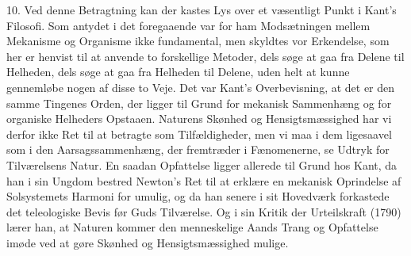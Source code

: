 \documentclass[12pt]{article}
\newcommand{\opage}[1]{\marginnote{\footnotesize\textit{[#1]}}}
\begin{document}
10. Ved denne Betragtning kan der kastes Lys over et væsentligt Punkt i
Kant's Filosofi. Som antydet i det foregaaende var for ham Modsætningen
mellem Mekanisme og Organisme ikke fundamental, men skyldtes vor
Erkendelse, som her er henvist til at anvende to forskellige Metoder,
dels søge at gaa fra Delene til Helheden, dels søge at gaa fra
Helheden til Delene, uden helt at kunne gennemløbe nogen af disse to
Veje. Det var Kant's Overbevisning, at det er den samme Tingenes Orden,
der ligger til Grund for mekanisk Sammenhæng og for organiske Helheders
Opstaaen. Naturens Skønhed og Hensigtsmæssighed har vi derfor ikke Ret
til at betragte som Tilfældigheder, men vi maa i dem ligesaavel som i
den Aarsagssammenhæng, der fremtræder i Fænomenerne, se Udtryk for
Tilværelsens Natur. En saadan Opfattelse ligger allerede til Grund hos
Kant, da han i sin Ungdom bestred Newton's Ret til at erklære en
mekanisk Oprindelse af Solsystemets Harmoni for umulig, og da han
senere i sit Hovedværk forkastede det teleologiske Bevis før Guds
Tilværelse. Og i sin \guillemotright{}Kritik der Urteilskraft\guillemotleft{} (1790) lærer han,
at Naturen kommer den menneskelige Aands Trang
\setcounter{footnote}{0}%
\opage{33}og Opfattelse imøde ved at gøre Skønhed og Hensigtsmæssighed
mulige.
\end{document}
